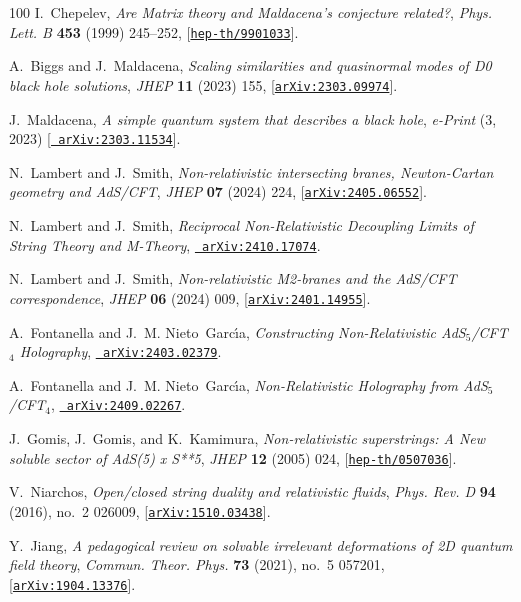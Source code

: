 \documentclass[11pt]{article}
\begin{document}
\begin{thebibliography}{100}
I.~Chepelev, {\it {Are Matrix theory and Maldacena's conjecture related?}},
  {\em Phys. Lett. B} {\bf 453} (1999) 245--252,
  [\href{http://arxiv.org/abs/hep-th/9901033}{{\tt hep-th/9901033}}].

A.~Biggs and J.~Maldacena, {\it {Scaling similarities and quasinormal modes of
  D0 black hole solutions}},  {\em JHEP} {\bf 11} (2023) 155,
  [\href{http://arxiv.org/abs/2303.09974}{{\tt arXiv:2303.09974}}].

J.~Maldacena, {\it {A simple quantum system that describes a black hole}},
  {\em e-Print} (3, 2023) [\href{http://arxiv.org/abs/2303.11534}{{\tt
  arXiv:2303.11534}}].

N.~Lambert and J.~Smith, {\it {Non-relativistic intersecting branes,
  Newton-Cartan geometry and AdS/CFT}},  {\em JHEP} {\bf 07} (2024) 224,
  [\href{http://arxiv.org/abs/2405.06552}{{\tt arXiv:2405.06552}}].

N.~Lambert and J.~Smith, {\it {Reciprocal Non-Relativistic Decoupling Limits of
  String Theory and M-Theory}},  \href{http://arxiv.org/abs/2410.17074}{{\tt
  arXiv:2410.17074}}.

N.~Lambert and J.~Smith, {\it {Non-relativistic M2-branes and the AdS/CFT
  correspondence}},  {\em JHEP} {\bf 06} (2024) 009,
  [\href{http://arxiv.org/abs/2401.14955}{{\tt arXiv:2401.14955}}].

A.~Fontanella and J.~M. Nieto~Garc\'\i{}a, {\it {Constructing Non-Relativistic
  AdS$_5$/CFT$_4$ Holography}},  \href{http://arxiv.org/abs/2403.02379}{{\tt
  arXiv:2403.02379}}.

A.~Fontanella and J.~M. Nieto~Garc\'\i{}a, {\it {Non-Relativistic Holography
  from AdS$_5$/CFT$_4$}},  \href{http://arxiv.org/abs/2409.02267}{{\tt
  arXiv:2409.02267}}.

J.~Gomis, J.~Gomis, and K.~Kamimura, {\it {Non-relativistic superstrings: A New
  soluble sector of AdS(5) x S**5}},  {\em JHEP} {\bf 12} (2005) 024,
  [\href{http://arxiv.org/abs/hep-th/0507036}{{\tt hep-th/0507036}}].

V.~Niarchos, {\it {Open/closed string duality and relativistic fluids}},  {\em
  Phys. Rev. D} {\bf 94} (2016), no.~2 026009,
  [\href{http://arxiv.org/abs/1510.03438}{{\tt arXiv:1510.03438}}].

Y.~Jiang, {\it {A pedagogical review on solvable irrelevant deformations of 2D
  quantum field theory}},  {\em Commun. Theor. Phys.} {\bf 73} (2021), no.~5
  057201, [\href{http://arxiv.org/abs/1904.13376}{{\tt arXiv:1904.13376}}].


\end{thebibliography}
\end{document}
